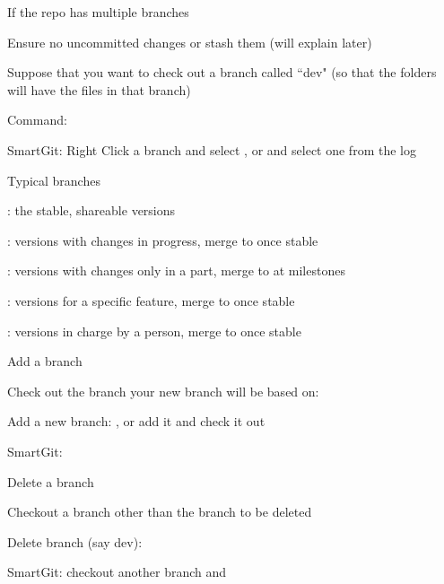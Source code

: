 \documentclass[hyperref,compress,handout,9pt,usepdftitle=false]{beamer}
\begin{document}
\begin{frame}{If the repo has multiple branches}
\begin{witemize}
\item Ensure no uncommitted changes or stash them (will explain later)
\item Suppose that you want to check out a branch called ``dev" (so that the folders will have the files in that branch)
\item Command: 
\item SmartGit: Right Click a branch and select , or  and select one from the log
\end{witemize}
\end{frame}

\begin{frame}{Typical branches}
\begin{witemize}
\item {}: the stable, shareable versions
\item {}: versions with changes in progress, merge to  once stable
\item {}: versions with changes only in a part, merge to  at milestones
\item {}: versions for a specific feature, merge to  once stable
\item {}: versions in charge by a person, merge to  once stable
\end{witemize}
\end{frame}

\begin{frame}{Add a branch}
\begin{witemize}
\item Check out the branch your new branch will be based on: 
\item Add a new branch: , or add it and check it out 
\item SmartGit: 
\end{witemize}
\end{frame}

\begin{frame}{Delete a branch}
\begin{witemize}
\item Checkout a branch other than the branch to be deleted
\item Delete branch (say dev): 
\item SmartGit: checkout another branch and 
\end{witemize}
\end{frame}
\end{document}
